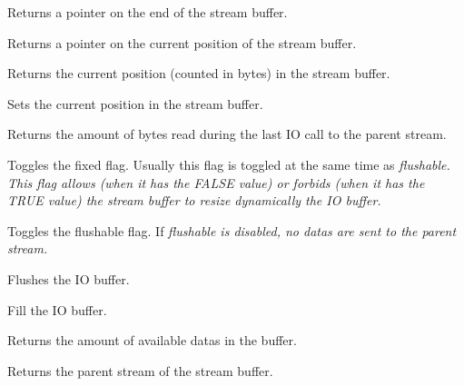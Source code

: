 
Returns a pointer on the end of the stream buffer.



Returns a pointer on the current position of the stream buffer.



Returns the current position (counted in bytes) in the stream buffer.



Sets the current position in the stream buffer.



Returns the amount of bytes read during the last IO call to the parent stream.



Toggles the fixed flag. Usually this flag is toggled at the same time as 
\it{flushable}. This flag allows (when it has the FALSE value) or forbids
(when it has the TRUE value) the stream buffer to resize dynamically the IO buffer.





Toggles the flushable flag. If \it{flushable} is disabled, no datas are sent
to the parent stream.



Flushes the IO buffer.



Fill the IO buffer.



Returns the amount of available datas in the buffer.



Returns the parent stream of the stream buffer.

